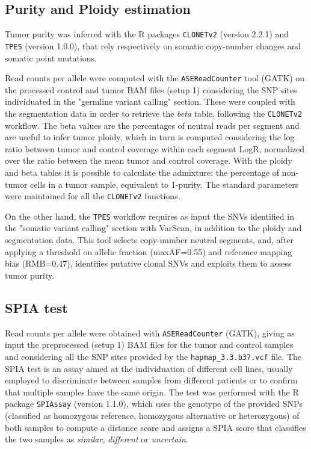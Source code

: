 \documentclass[11pt]{article}
\begin{document}
\subsection*{Purity and Ploidy estimation}

Tumor purity was inferred with the R packages \texttt{CLONETv2} (version 2.2.1)\cite{clonet} and \texttt{TPES} (version 1.0.0)\cite{tpes}, that rely respectively on somatic copy-number changes and somatic point mutations.

Read counts per allele were computed with the \texttt{ASEReadCounter} tool (GATK) on the processed control and tumor BAM files (setup 1) considering the SNP sites individuated in the "germline variant calling" section. These were coupled with the segmentation data in order to retrieve the \textit{beta} table, following the \texttt{CLONETv2} workflow. The beta values are the percentages of neutral reads per segment and are useful to infer tumor ploidy, which in turn is computed considering the log ratio between tumor and control coverage within each segment LogR, normalized over the ratio between the mean tumor and control coverage. With the ploidy and beta tables it is possible to calculate the admixture: the percentage of non-tumor cells in a tumor sample, equivalent to 1-purity. The standard parameters were maintained for all the \texttt{CLONETv2} functions.

On the other hand, the \texttt{TPES} workflow requires as input the SNVs identified in the "somatic variant calling" section with VarScan, in addition to the ploidy and segmentation data. This tool selects copy-number neutral segments, and, after applying a threshold on allelic fraction (maxAF=0.55) and reference mapping bias (RMB=0.47), identifies putative clonal SNVs and exploits them to assess tumor purity.


\subsection*{SPIA test}

Read counts per allele were obtained with \texttt{ASEReadCounter} (GATK), giving as input the preprocessed (setup 1) BAM files for the tumor and control samples and considering all the SNP sites provided by the \texttt{hapmap\_3.3.b37.vcf} file. The SPIA test is an assay aimed at the individuation of different cell lines, usually employed to discriminate between samples from different patients or to confirm that multiple samples have the same origin. The test was performed with the R package \texttt{SPIAssay} (version 1.1.0)\cite{spia}, which uses the genotype of the provided SNPs (classified as homozygous reference, homozygous alternative or heterozygous) of both samples to compute a distance score and assigns a SPIA score that classifies the two samples as \textit{similar}, \textit{different} or \textit{uncertain}.
\end{document}
